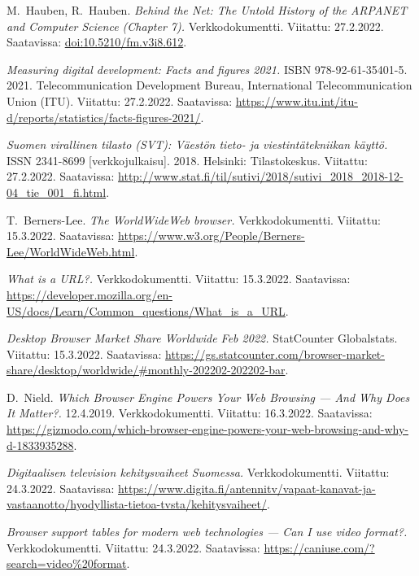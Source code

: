 \documentclass[finnish, 12pt, a4paper, elec, utf8, a-1b, online]{aaltothesis}
\begin{document}
\begin{thebibliography}{99}

    M.\ Hauben, R.\ Hauben.
    \textit{Behind the Net: The Untold History of the ARPANET and Computer Science (Chapter 7).}
    Verkkodokumentti.
    Viitattu: 27.2.2022.
    Saatavissa: \url{doi:10.5210/fm.v3i8.612}.

    \textit{Measuring digital development: Facts and figures 2021.}
    ISBN 978-92-61-35401-5.
    2021.
    Telecommunication Development Bureau, International Telecommunication Union (ITU).
    Viitattu: 27.2.2022.
    Saatavissa: \url{https://www.itu.int/itu-d/reports/statistics/facts-figures-2021/}.

    \textit{Suomen virallinen tilasto (SVT): Väestön tieto- ja viestintätekniikan käyttö.}
    ISSN 2341-8699 [verkkojulkaisu].
    2018.
    Helsinki: Tilastokeskus.
    Viitattu: 27.2.2022.
    Saatavissa: \url{http://www.stat.fi/til/sutivi/2018/sutivi_2018_2018-12-04_tie_001_fi.html}.

    T.\ Berners-Lee.
    \textit{The WorldWideWeb browser.}
    Verkkodokumentti.
    Viitattu: 15.3.2022.
    Saatavissa: \url{https://www.w3.org/People/Berners-Lee/WorldWideWeb.html}.

    \textit{What is a URL?.}
    Verkkodokumentti.
    Viitattu: 15.3.2022.
    Saatavissa: \url{https://developer.mozilla.org/en-US/docs/Learn/Common_questions/What_is_a_URL}.

    \textit{Desktop Browser Market Share Worldwide Feb 2022.}
    StatCounter Globalstats.
    Viitattu: 15.3.2022.
    Saatavissa: \url{https://gs.statcounter.com/browser-market-share/desktop/worldwide/#monthly-202202-202202-bar}.

    D.\ Nield.
    \textit{Which Browser Engine Powers Your Web Browsing — And Why Does It Matter?.}
    12.4.2019.
    Verkkodokumentti.
    Viitattu: 16.3.2022.
    Saatavissa: \url{https://gizmodo.com/which-browser-engine-powers-your-web-browsing-and-why-d-1833935288}.

    \textit{Digitaalisen television kehitysvaiheet Suomessa.}
    Verkkodokumentti.
    Viitattu: 24.3.2022.
    Saatavissa: \url{https://www.digita.fi/antennitv/vapaat-kanavat-ja-vastaanotto/hyodyllista-tietoa-tvsta/kehitysvaiheet/}.

    \textit{Browser support tables for modern web technologies — Can I use video format?.}
    Verkkodokumentti.
    Viitattu: 24.3.2022.
    Saatavissa: \url{https://caniuse.com/?search=video%20format}.


\end{thebibliography}
\end{document}
